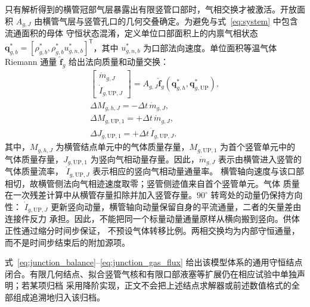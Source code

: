 只有解析得到的横管冠部气层暴露出有限竖管口部时，气相交换才被激活。开放面积 $A_{g,J}$
由横管气层与竖管孔口的几何交叠确定。为避免与式~\eqref{eq:system} 中包含流通面积的母体
守恒状态混淆，定义单位口部面积上的内禀气相状态
$\mathbf q_{g,b}^*=[\rho_{g,b}^*,\rho_{g,b}^*u_{g,n,b}^*]^{\mathsf T}$，其中
$u_{g,n,b}^*$ 为口部法向速度。单位面积等温气体 Riemann 通量
$\widehat{\mathbf f}_g$ 给出法向质量和动量交换：
\begin{equation}
\begin{gathered}
\begin{bmatrix}\dot m_{g,J}\\ \dot I_{g,\mathrm{UP},J}\end{bmatrix}
=A_{g,J}\widehat{\mathbf f}_g
 \left(\mathbf q_{g,h}^*,\mathbf q_{g,\mathrm{UP}}^*\right),\\[3pt]
\Delta M_{g,h,J}=-\Delta t\,\dot m_{g,J},\\[3pt]
\Delta M_{g,\mathrm{UP},1}=+\Delta t\,\dot m_{g,J},\\[3pt]
\Delta J_{g,\mathrm{UP},1}=+\Delta t\,\dot I_{g,\mathrm{UP},J}.
\end{gathered}
\label{eq:junction_gas_flux}
\end{equation}
其中，$M_{g,h,J}$ 为横管结点单元中的气体质量存量，$M_{g,\mathrm{UP},1}$ 为首个竖管单元中的
气体质量存量，$J_{g,\mathrm{UP},1}$ 为竖向气相动量存量。因此，$\dot m_{g,J}$ 表示由横管进入竖管的气体质量流率，
$\dot I_{g,\mathrm{UP},J}$ 表示相应的竖向气相动量通量率。
横管轴向速度与该口部相切，故横管侧法向气相迹速度取零；竖管侧迹值来自首个竖管单元。气体
质量在一次残差计算中从横管存量扣除并加入竖管存量。$90^{\circ}$ 转弯处的动量仍保持方向性：
$\dot I_{g,\mathrm{UP},J}$ 更新竖向动量，横管轴向动量保留自身的平流通量，二者的矢量差由连接件反力
承担。因此，不能把同一个标量动量通量原样从横向搬到竖向。供体正性通过缩分时间步保证，
不预设气体转移比例。两相交换均为内部守恒通量，而不是时间步结束后的附加源项。

式~\eqref{eq:junction_balance}--\eqref{eq:junction_gas_flux} 给出该模型体系的通用守恒结点
闭合。有限几何结点、拟合竖管气核和有限口部液塞等扩展仍在相应试验中单独声明；若某项归档
采用降阶实现，正文不会把上述结点求解器或前述数值格式的全部组成追溯地归入该归档。
